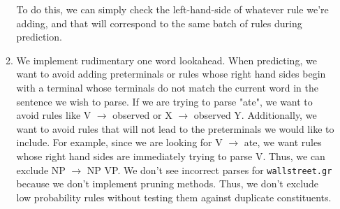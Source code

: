 \documentclass[11pt]{article}
\begin{document}
\begin{enumerate}
\begin{enumerate}
			To do this, we can simply check the left-hand-side of whatever rule we're adding, and that will correspond to the same batch of rules during prediction.
		\item
			We implement rudimentary one word lookahead. When predicting, we want to avoid adding preterminals or rules whose right hand sides begin with a terminal whose terminals do not match the current word in the sentence we wish to parse. If we are trying to parse "ate", we want to avoid rules like V $\rightarrow$ observed or X $\rightarrow$ observed Y. Additionally, we want to avoid rules that will not lead to the preterminals we would like to include. For example, since we are looking for V $\rightarrow$ ate, we want rules whose right hand sides are immediately trying to parse V. Thus, we can exclude NP $\rightarrow$ NP VP. We don't see incorrect parses for \texttt{wallstreet.gr} because we don't implement pruning methods. Thus, we don't exclude low probability rules without testing them against duplicate constituents. 
	\end{enumerate}

\end{enumerate}
\end{document}
